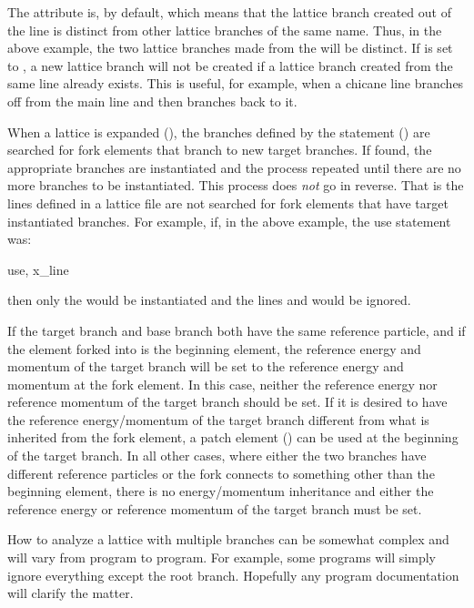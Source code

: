The  attribute is, by default,  which means that the lattice branch created
out of the  line is distinct from other lattice branches of the same name. Thus, in the
above example, the two lattice branches made from the  will be distinct. If
 is set to , a new lattice branch will not be created if a lattice branch
created from the same line already exists. This is useful, for example, when a chicane line branches
off from the main line and then branches back to it.

When a lattice is expanded (), the branches defined by the  statement
() are searched for fork elements that branch to new target branches. If found, the
appropriate branches are instantiated and the process repeated until there are no more branches to
be instantiated. This process does {\em not} go in reverse. That is the lines defined in a lattice
file are not searched for fork elements that have target instantiated branches. For example, if, in
the above example, the use statement was:
\begin{example}
  use, x_line
\end{example}
then only the  would be instantiated and the lines  and  would be
ignored.

If the target branch and base branch both have the same reference particle, and if the element
forked into is the beginning element, the reference energy and momentum of the target branch will be
set to the reference energy and momentum at the fork element. In this case, neither the reference
energy nor reference momentum of the target branch should be set. If it is desired to have the
reference energy/momentum of the target branch different from what is inherited from the fork
element, a patch element () can be used at the beginning of the target branch. In all
other cases, where either the two branches have different reference particles or the fork connects
to something other than the beginning element, there is no energy/momentum inheritance and either
the reference energy or reference momentum of the target branch must be set.

How to analyze a lattice with multiple branches can be somewhat complex and will vary from program
to program. For example, some programs will simply ignore everything except the root branch. Hopefully
any program documentation will clarify the matter.

